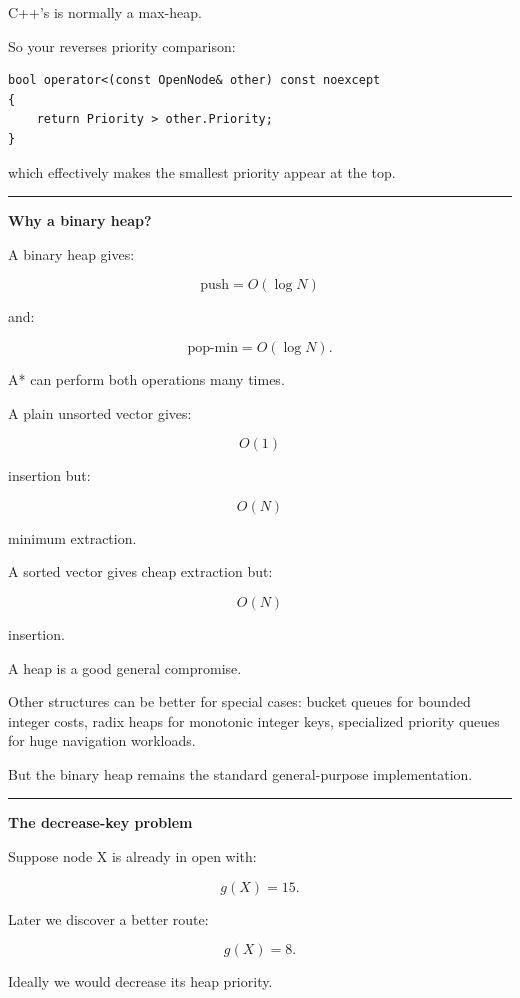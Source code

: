C++'s  is normally a max-heap.

So your  reverses priority comparison:

\begin{verbatim}
bool operator<(const OpenNode& other) const noexcept
{
    return Priority > other.Priority;
}
\end{verbatim}

which effectively makes the smallest priority appear at the top.

\begin{center}\rule{0.5\linewidth}{0.5pt}\end{center}

\textbf{Why a binary heap?}

A binary heap gives:

\[
\text{push}=O(\log N)
\]

and:

\[
\text{pop-min}=O(\log N).
\]

A* can perform both operations many times.

A plain unsorted vector gives:

\[
O(1)
\]

insertion but:

\[
O(N)
\]

minimum extraction.

A sorted vector gives cheap extraction but:

\[
O(N)
\]

insertion.

A heap is a good general compromise.

Other structures can be better for special cases: bucket queues for bounded integer costs, radix heaps for monotonic integer keys, specialized priority queues for huge navigation workloads.

But the binary heap remains the standard general-purpose implementation.

\begin{center}\rule{0.5\linewidth}{0.5pt}\end{center}

\textbf{The decrease-key problem}

Suppose node X is already in open with:

\[
g(X)=15.
\]

Later we discover a better route:

\[
g(X)=8.
\]

Ideally we would decrease its heap priority.


